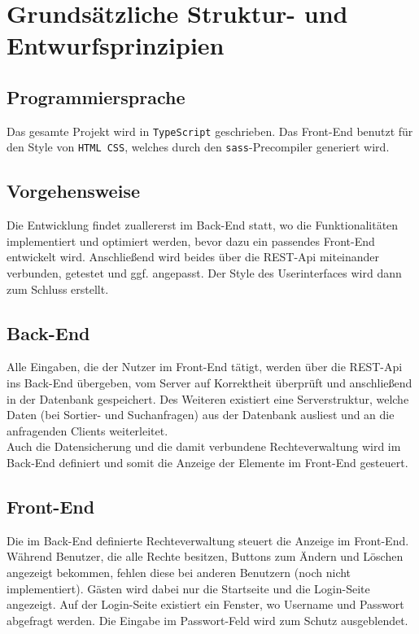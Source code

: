 \documentclass[11pt,a4paper]{report}
\begin{document}
	\section{Grundsätzliche Struktur- und Entwurfsprinzipien}
	\subsection{Programmiersprache}
	Das gesamte Projekt wird in \texttt{TypeScript} geschrieben. Das Front-End benutzt für den Style von \texttt{HTML CSS}, welches durch den \texttt{sass}-Precompiler generiert wird.
	
	\subsection{Vorgehensweise}
	Die Entwicklung findet zuallererst im Back-End statt, wo die Funktionalitäten implementiert und optimiert werden, bevor dazu ein passendes Front-End entwickelt wird. Anschließend wird beides über die REST-Api miteinander verbunden, getestet und ggf. angepasst. Der Style des Userinterfaces wird dann zum Schluss erstellt.
	\clearpage
	
	\subsection{Back-End}
	Alle Eingaben, die der Nutzer im Front-End tätigt, werden über die REST-Api ins Back-End übergeben, vom Server auf Korrektheit überprüft und anschließend in der Datenbank gespeichert. Des Weiteren existiert eine Serverstruktur, welche Daten (bei Sortier- und Suchanfragen) aus der Datenbank ausliest und an die anfragenden Clients weiterleitet.\\
	Auch die Datensicherung und die damit verbundene Rechteverwaltung wird im Back-End definiert und somit die Anzeige der Elemente im Front-End gesteuert.
	
	\subsection{Front-End}
	Die im Back-End definierte Rechteverwaltung steuert die Anzeige im Front-End. Während Benutzer, die alle Rechte besitzen, Buttons zum Ändern und Löschen angezeigt bekommen, fehlen diese bei anderen Benutzern (noch nicht implementiert). 
	Gästen wird dabei nur die Startseite und die Login-Seite angezeigt. 
	Auf der Login-Seite existiert ein Fenster, wo Username und Passwort abgefragt werden. 
	Die Eingabe im Passwort-Feld wird zum Schutz ausgeblendet.
	
\end{document}

